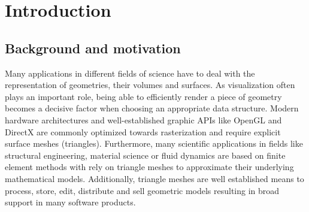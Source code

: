 \chapter{Introduction}

\section{Background and motivation}

Many applications in different fields of science have to deal with the representation of geometries, their volumes and surfaces.
As visualization often plays an important role, being able to efficiently render a piece of geometry becomes a decisive factor when choosing an appropriate data structure.
Modern hardware architectures and well-established graphic APIs like OpenGL and DirectX are commonly optimized towards rasterization and require explicit surface meshes (\ie triangles).
Furthermore, many scientific applications in fields like structural engineering, material science or fluid dynamics are based on finite element methods with rely on triangle meshes to approximate their underlying mathematical models.
Additionally, triangle meshes are well established means to process, store, edit, distribute and sell geometric models resulting in broad support in many software products.


